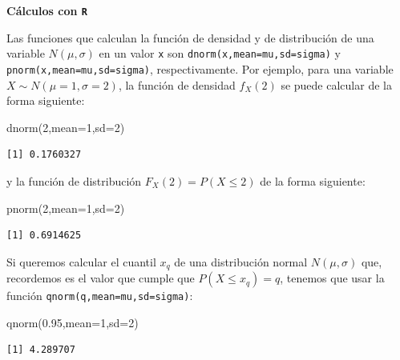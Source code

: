 \documentclass[
  letterpaper,
  DIV=11,
  numbers=noendperiod]{scrreprt}
\newenvironment{Shaded}{\begin{snugshade}}{\end{snugshade}}
\newcommand{\AttributeTok}[1]{\textcolor[rgb]{0.40,0.45,0.13}{#1}}
\newcommand{\DecValTok}[1]{\textcolor[rgb]{0.68,0.00,0.00}{#1}}
\newcommand{\FloatTok}[1]{\textcolor[rgb]{0.68,0.00,0.00}{#1}}
\newcommand{\FunctionTok}[1]{\textcolor[rgb]{0.28,0.35,0.67}{#1}}
\newcommand{\NormalTok}[1]{\textcolor[rgb]{0.00,0.23,0.31}{#1}}
\begin{document}
\textbf{Cálculos con \texttt{R}}

Las funciones que calculan la función de densidad y de distribución de
una variable \(N(\mu,\sigma)\) en un valor \texttt{x} son
\texttt{dnorm(x,mean=mu,sd=sigma)} y \texttt{pnorm(x,mean=mu,sd=sigma)},
respectivamente. Por ejemplo, para una variable
\(X\sim N(\mu=1,\sigma=2)\), la función de densidad \(f_X(2)\) se puede
calcular de la forma siguiente:

\begin{Shaded}
\begin{Highlighting}[]
\FunctionTok{dnorm}\NormalTok{(}\DecValTok{2}\NormalTok{,}\AttributeTok{mean=}\DecValTok{1}\NormalTok{,}\AttributeTok{sd=}\DecValTok{2}\NormalTok{)}
\end{Highlighting}
\end{Shaded}

\begin{verbatim}
[1] 0.1760327
\end{verbatim}

y la función de distribución \(F_X(2) = P(X\leq 2)\) de la forma
siguiente:

\begin{Shaded}
\begin{Highlighting}[]
\FunctionTok{pnorm}\NormalTok{(}\DecValTok{2}\NormalTok{,}\AttributeTok{mean=}\DecValTok{1}\NormalTok{,}\AttributeTok{sd=}\DecValTok{2}\NormalTok{) }
\end{Highlighting}
\end{Shaded}

\begin{verbatim}
[1] 0.6914625
\end{verbatim}

Si queremos calcular el cuantil \(x_{q}\) de una distribución normal
\(N(\mu,\sigma)\) que, recordemos es el valor que cumple que
\(P(X\leq x_{q})=q\), tenemos que usar la función
\texttt{qnorm(q,mean=mu,sd=sigma)}:

\begin{Shaded}
\begin{Highlighting}[]
\FunctionTok{qnorm}\NormalTok{(}\FloatTok{0.95}\NormalTok{,}\AttributeTok{mean=}\DecValTok{1}\NormalTok{,}\AttributeTok{sd=}\DecValTok{2}\NormalTok{)}
\end{Highlighting}
\end{Shaded}

\begin{verbatim}
[1] 4.289707
\end{verbatim}
\end{document}

